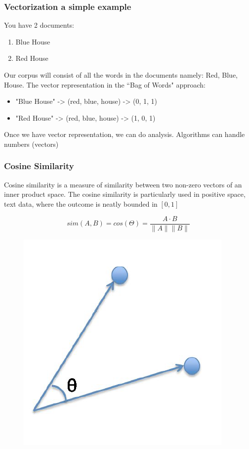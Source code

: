 \documentclass[compress, aspectratio=54]{beamer}
\begin{document}


\begin{frame}
\frametitle{Vectorization a simple example}
You have 2 documents:
\begin{enumerate}
\item  Blue House
\item Red House
\end{enumerate}
 Our corpus will consist of all the words in the documents namely: Red, Blue, House. The vector representation in the  ``Bag of Words" approach: 

\begin{itemize}

\item "Blue House" -> (red, blue, house) -> (0, 1, 1)
\item "Red House" -> (red, blue, house) -> (1, 0, 1)
\end{itemize}

Once we have vector representation, we can do analysis. Algorithms can handle numbers (vectors)
\end{frame}



\begin{frame}
\frametitle{Cosine Similarity}
Cosine similarity is a measure of similarity between two non-zero vectors of an inner product space.  The cosine similarity is particularly used in positive space, text data,  where the outcome is neatly bounded in $[0,1]$

\[
sim(A, B)=cos(\Theta)= \frac{A \cdot B}{\| A \| \| B \|}
\]
\begin{figure}

\includegraphics[width=0.2\linewidth ]{Figures/cosine_sim.png}
\end{figure}
\end{frame}


\end{document}
